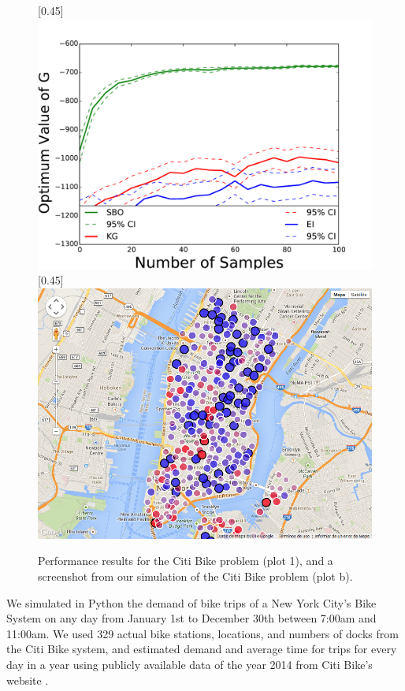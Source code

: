 \documentclass{article}
\begin{document}
\begin{figure}[!htb]
    \centering
    [0.45\linewidth]{
      \includegraphics[width=0.45\linewidth]{newcomparisonSameConfiguration.pdf}}
          \quad
     [0.45\linewidth]{
      \includegraphics[width=0.45\linewidth]{testStationMapPng0-full.png}}
\caption{Performance results for the Citi Bike problem (plot 1), and a screenshot from our simulation of the Citi Bike problem (plot b).
    \label{fig:stuff}}
\end{figure}


We simulated in Python the demand of bike trips of a New York City's Bike System on any day from January 1st to December 30th between 7:00am and 11:00am. We used 329 actual bike stations, locations, and numbers of docks from the Citi Bike system, and estimated demand and average time for trips for every day in a year using publicly available data of the year 2014 from Citi Bike's website \cite{citibike}.

\end{document}
